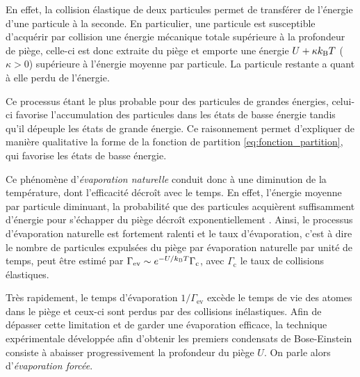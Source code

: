 En effet, la collision élastique de deux particules permet de transférer de l'énergie d'une particule à la seconde. En particulier, une particule est susceptible d'acquérir par collision une énergie mécanique totale supérieure à la profondeur de piège, celle-ci est donc extraite du piège et emporte une énergie $U+\kappa k_{\mathrm{B}} T$ ($\kappa>0$) supérieure à l'énergie moyenne par particule. La particule restante a quant à elle perdu de l'énergie. 

Ce processus étant le plus probable pour des particules de grandes énergies, celui-ci favorise l'accumulation des particules dans les états de basse énergie tandis qu'il dépeuple les états de grande énergie. Ce raisonnement permet d'expliquer de manière qualitative la forme de la fonction de partition \ref{eq:fonction_partition}, qui favorise les états de basse énergie.

Ce phénomène d'\emph{évaporation naturelle} conduit donc à une diminution de la température, dont l'efficacité décroît avec le temps. En effet, l'énergie moyenne par particule diminuant, la probabilité que des particules acquièrent suffisamment d'énergie pour s'échapper du piège décroît exponentiellement \citep{walraven2010elements}. Ainsi, le processus d'évaporation naturelle est fortement ralenti et le taux d'évaporation, c'est à dire le nombre de particules expulsées du piège par évaporation naturelle par unité de temps, peut être estimé par $\Gamma_{\mathrm{ev}}\sim e^{-U/k_{\mathrm{B}} T} \Gamma_{\mathrm{c}}$, avec $\Gamma_{\mathrm{c}}$ le taux de collisions élastiques.

Très rapidement, le temps d'évaporation $1/\Gamma_{\mathrm{ev}}$ excède le temps de vie des atomes dans le piège et ceux-ci sont perdus par des collisions inélastiques. Afin de dépasser cette limitation et de garder une évaporation efficace, la technique expérimentale développée afin d'obtenir les premiers condensats de Bose-Einstein consiste à abaisser progressivement la profondeur du piège $U$. On parle alors d'\emph{évaporation forcée}.





